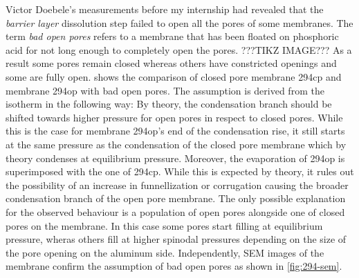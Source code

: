 \documentclass[../thesis.tex]{subfiles}
\begin{document}
        Victor Doebele's measurements before my internship had revealed that the \textit{barrier layer} dissolution step failed to open all the pores of some membranes. The term \textit{bad open pores} refers to a membrane that has been floated on phosphoric acid for not long enough to completely open the pores. ???TIKZ IMAGE??? As a result some pores remain closed whereas others have constricted openings and some are fully open.  shows the comparison of closed pore membrane 294cp and membrane 294op with bad open pores. The assumption is derived from the isotherm in the following way: By theory, the condensation branch should be shifted towards higher pressure for open pores in respect to closed pores. While this is the case for membrane 294op's end of the condensation rise, it still starts at the same pressure as the condensation of the closed pore membrane which by theory condenses at equilibrium pressure. Moreover, the evaporation of 294op is superimposed with the one of 294cp. While this is expected by theory, it rules out the possibility of an increase in funnellization or corrugation causing the broader condensation branch of the open pore membrane. The only possible explanation for the observed behaviour is a population of open pores alongside one of closed pores on the membrane. In this case some pores start filling at equilibrium pressure, wheras others fill at higher spinodal pressures depending on the size of the pore opening on the aluminum side. Independently, SEM images of the membrane confirm the assumption of bad open pores as shown in \cref{fig:294-sem}.
\end{document}
